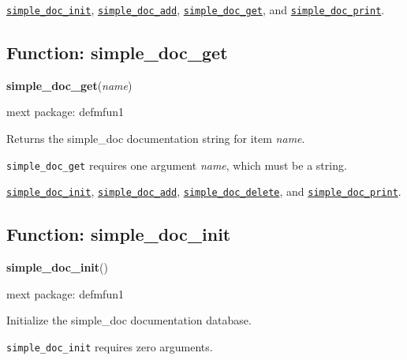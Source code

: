 \documentclass[]{article}
\begin{document}
  \hyperlink{simple_doc_init}{{\tt simple\_doc\_init}}, \hyperlink{simple_doc_add}{{\tt simple\_doc\_add}}, \hyperlink{simple_doc_get}{{\tt simple\_doc\_get}}, and \hyperlink{simple_doc_print}{{\tt simple\_doc\_print}}.

\vspace{5 pt}


\subsection{Function: simple\_doc\_get\label{sec:simple_doc_get}}
\hypertarget{simple_doc_get}{}
{\bf simple\_doc\_get}({\it name})


\noindent mext package: defmfun1



\vspace{5 pt}
Returns the simple\_doc documentation string for item {\it name}. 

\vspace{5 pt}

   {\tt simple\_doc\_get} requires one argument {\it name}, which must be a string.


\vspace{5 pt}


  \hyperlink{simple_doc_init}{{\tt simple\_doc\_init}}, \hyperlink{simple_doc_add}{{\tt simple\_doc\_add}}, \hyperlink{simple_doc_delete}{{\tt simple\_doc\_delete}}, and \hyperlink{simple_doc_print}{{\tt simple\_doc\_print}}.

\vspace{5 pt}


\subsection{Function: simple\_doc\_init\label{sec:simple_doc_init}}
\hypertarget{simple_doc_init}{}
{\bf simple\_doc\_init}()


\noindent mext package: defmfun1



\vspace{5 pt}
Initialize the simple\_doc documentation database. 

\vspace{5 pt}

   {\tt simple\_doc\_init} requires zero arguments.


\vspace{5 pt}
\end{document}
